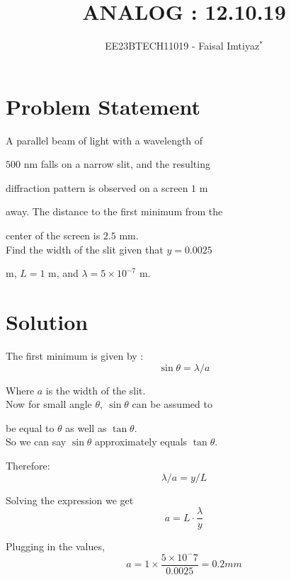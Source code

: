 \documentclass[journal,12pt,twocolumn]{IEEEtran}
\theoremstyle{remark}
\begin{document}
\title{ANALOG : 12.10.19}
\author{EE23BTECH11019 - Faisal Imtiyaz$^{*}$}%
\maketitle


\section{Problem Statement}

A parallel beam of light with a wavelength of 

$500$ nm falls on a narrow slit, and the resulting

diffraction pattern is observed on a screen $1$ m

away. The distance to the first minimum from the

center of the screen is $2.5$ mm.\\

Find the width of the slit given that $y = 0.0025$ 

m, $L = 1$ m, and $\lambda = 5 \times 10^{-7}$ m.\\

\section{Solution}
The first minimum is given by
:$$\sin\theta = \lambda/{a}$$

Where $a$ is the width of the slit.\\

Now for small angle $\theta,\  \sin\theta$ can be assumed to 

be equal to $\theta$ as well as $\tan\theta$.\\

So we can say $\sin\theta $ approximately equals $\tan\theta$.

Therefore:
$$\lambda/a = y/L$$

Solving the expression we get $$a= L\cdot\frac{\lambda}{y}$$

Plugging in the values, $$a=1\times\frac{5\times10^-7}{0.0025} = 0.2 mm$$
\end{document}
